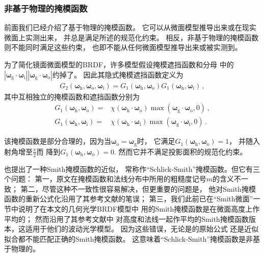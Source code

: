 \subsubsection*{非基于物理的掩模函数}
前面我们已经介绍了基于物理的掩模函数。
它可以从微面模型推导出来或在现实微面上实测出来，
并总是满足所述的规范化约束。
相反，非基于物理的掩模函数则不能同时满足这些约束，
也即不能从任何微面模型推导出来或被实测到。

为了简化镜面微面模型的BRDF，许多模型假设掩模遮挡函数和分母
中的$|{\bm\omega}_{\mathrm{g}}\cdot{\bm\omega}_{\mathrm{i}}||{\bm\omega}_{\mathrm{g}}\cdot{\bm\omega}_{\mathrm{o}}|$约掉了。
因此其隐式掩模遮挡函数定义为
\begin{align}
    G_2({\bm\omega}_{\mathrm{h}},{\bm\omega}_{\mathrm{o}},{\bm\omega}_{\mathrm{i}})
    =G_1({\bm\omega}_{\mathrm{h}},{\bm\omega}_{\mathrm{o}})G_1({\bm\omega}_{\mathrm{h}},{\bm\omega}_{\mathrm{i}})\, ,
\end{align}
其中互相独立的掩模函数和遮挡函数分别为
\begin{align}
    G_1({\bm\omega}_{\mathrm{h}},{\bm\omega}_{\mathrm{o}})
    = & \chi({\bm\omega}_{\mathrm{h}}\cdot{\bm\omega}_{\mathrm{o}})
    \max({\bm\omega}_{\mathrm{g}}\cdot{\bm\omega}_{\mathrm{o}},0)\, , \\
    G_1({\bm\omega}_{\mathrm{h}},{\bm\omega}_{\mathrm{i}})
    = & \chi({\bm\omega}_{\mathrm{h}}\cdot{\bm\omega}_{\mathrm{i}})
    \max({\bm\omega}_{\mathrm{g}}\cdot{\bm\omega}_{\mathrm{i}},0)\, .
\end{align}

该掩模函数是部分合理的，因为当${\bm\omega}_{\mathrm{o}}={\bm\omega}_{\mathrm{g}}$时，
它满足$G_1({\bm\omega}_{\mathrm{h}},{\bm\omega}_{\mathrm{o}})=1$，
并随入射角增至$\displaystyle\frac{\pi}{2}$而
降到$G_1({\bm\omega}_{\mathrm{h}},{\bm\omega}_{\mathrm{o}})=0$.
然而它并不满足投影面积的规范化约束。

\citet{10.1111/1467-8659.1330233}也提出了一种Smith掩模函数的近似，
常称作“Schlick-Smith”掩模函数。但它有三个问题：
第一，原文在掩模函数和法线分布中所用的粗糙度记号$m$的含义不一致；
第二，尽管这种不一致性很容易解决，但更重要的问题是，
他对Smith掩模函数的重新公式化沿用了其参考文献的笔误；
第三，我们此前已在“Smith微面”一节中说明了在本文的几何光学BRDF模型中
用的Smith掩模函数是在微面高度上作平均的；
然而\citeauthor{10.1111/1467-8659.1330233}沿用了其参考文献中
对高度和法线一起作平均的Smith掩模函数版本，这适用于他们的波动光学模型。
因为这些错误，无论是\citeauthor{10.1111/1467-8659.1330233}的原始公式
还是近似拟合都不能匹配正确的Smith掩模函数。
这意味着“Schlick-Smith”掩模函数是非基于物理的。

